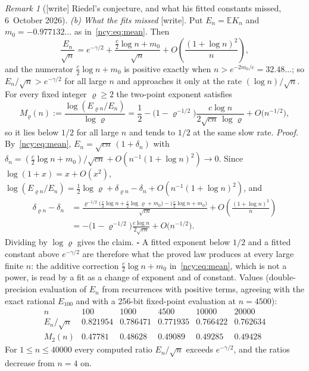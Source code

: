 \documentclass[11pt,letterpaper]{article}
\numberwithin{equation}{section}
\theoremstyle{remark}\newtheorem{remark}[theorem]{Remark}
\newcommand{\EE}{\mathbb E}
\theoremstyle{definition}\newtheorem{definition}[theorem]{Definition}\theoremstyle{plain}
\begin{document}
\begin{remark}[{[write]} Riedel's conjecture, and what his fitted constants missed, 6~October 2026]
\emph{(b) What the fits missed} [write]. Put $E_n=\EE K_n$ and
$m_0=-0.977132\ldots$ as in~\eqref{ncy:eq:mean}. Then
\begin{equation*}
 \frac{E_n}{\sqrt n}=e^{-\gamma/2}+\frac{\frac c2\log n+m_0}{\sqrt n}
   +O\!\left(\frac{(1+\log n)^2}{n}\right),
\end{equation*}
and the numerator $\frac c2\log n+m_0$ is positive exactly when
$n>e^{-2m_0/c}=32.48\ldots$; so $E_n/\sqrt n>e^{-\gamma/2}$ for all large
$n$ and approaches it only at the rate $(\log n)/\sqrt n$. For every fixed
integer $\varrho\ge2$ the two-point exponent satisfies
\begin{equation*}
 M_\varrho(n):=\frac{\log(E_{\varrho n}/E_n)}{\log\varrho}
  =\frac12-\bigl(1-\varrho^{-1/2}\bigr)\frac{c\log n}{2\sqrt{cn}\,\log\varrho}
   +O\bigl(n^{-1/2}\bigr),
\end{equation*}
so it lies below $1/2$ for all large $n$ and tends to $1/2$ at the same slow
rate. \emph{Proof.} By~\eqref{ncy:eq:mean},
$E_n=\sqrt{cn}\,(1+\delta_n)$ with
$\delta_n=(\frac c2\log n+m_0)/\sqrt{cn}+O(n^{-1}(1+\log n)^2)\to0$. Since
$\log(1+x)=x+O(x^2)$,
$\log(E_{\varrho n}/E_n)=\frac12\log\varrho+\delta_{\varrho n}-\delta_n
+O(n^{-1}(1+\log n)^2)$, and
\[
\begin{aligned}
 \delta_{\varrho n}-\delta_n
 &=\frac{\varrho^{-1/2}\bigl(\frac c2\log n+\frac c2\log\varrho+m_0\bigr)
   -\bigl(\frac c2\log n+m_0\bigr)}{\sqrt{cn}}+O\!\left(\frac{(1+\log n)^2}{n}\right)\\
 &=-\bigl(1-\varrho^{-1/2}\bigr)\frac{c\log n}{2\sqrt{cn}}+O\bigl(n^{-1/2}\bigr).
\end{aligned}
\]
Dividing by $\log\varrho$ gives the claim. $\square$ A fitted exponent below
$1/2$ and a fitted constant above $e^{-\gamma/2}$ are therefore what the
proved law produces at every large finite $n$: the additive correction
$\frac c2\log n+m_0$ in~\eqref{ncy:eq:mean}, which is not a power, is read
by a fit as a change of exponent and of constant. Values (double-precision
evaluation of $E_n$ from recurrences with positive terms, agreeing with the
exact rational $E_{100}$ and with a 256-bit fixed-point evaluation at
$n=4500$):
\[
\begin{array}{r|ccccc}
 n & 100 & 1000 & 4500 & 10000 & 20000\\\hline
 E_n/\sqrt n & 0.821954 & 0.786471 & 0.771935 & 0.766422 & 0.762634\\
 M_2(n) & 0.47781 & 0.48628 & 0.49089 & 0.49285 & 0.49428
\end{array}
\]
For $1\le n\le40000$ every computed ratio $E_n/\sqrt n$ exceeds
$e^{-\gamma/2}$, and the ratios decrease from $n=4$ on.


\end{remark}
\end{document}
